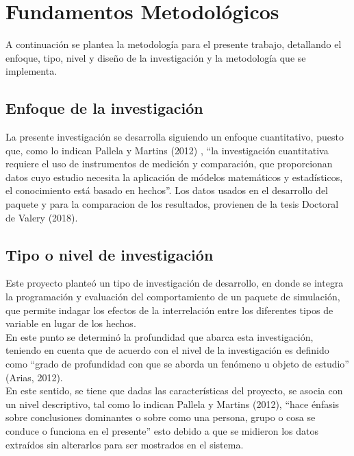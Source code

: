 \chapter{Fundamentos Metodol\'ogicos}

	A continuaci\'on se plantea la metodolog\'ia para el presente trabajo, detallando el enfoque, tipo, nivel y dise\~no de la investigaci\'on y la metodolog\'ia que se implementa.
	
\section{Enfoque de la investigaci\'on}
	
	La presente investigaci\'on se desarrolla siguiendo un enfoque cuantitativo, puesto que, como lo indican Pallela y  Martins (2012) , “la investigaci\'on cuantitativa requiere el uso de instrumentos de medici\'on y comparaci\'on, que proporcionan datos cuyo estudio necesita la aplicaci\'on de m\'odelos matem\'aticos y estad\'isticos, el conocimiento est\'a basado en hechos”.  Los datos usados en el desarrollo del paquete y para la comparacion de los resultados, provienen de la tesis Doctoral de Valery (2018).\\
	
\section{Tipo o nivel de investigaci\'on}
	
	Este proyecto plante\'o un tipo de investigaci\'on de desarrollo, en donde se integra la programaci\'on y evaluaci\'on del comportamiento de un paquete de simulación, que permite indagar los efectos de la interrelaci\'on entre los diferentes tipos de variable en lugar de los hechos.\\

	En este punto se determinó la profundidad que abarca esta investigaci\'on, teniendo en cuenta que de acuerdo con  el nivel de la investigaci\'on es definido como “grado de profundidad con que se aborda un fen\'omeno u objeto de estudio” (Arias, 2012).\\

	En este sentido, se tiene que dadas las caracter\'isticas del proyecto, se asocia con un nivel descriptivo, tal como lo indican Pallela y  Martins (2012),  “hace \'enfasis sobre conclusiones dominantes o sobre como una persona, grupo o cosa se conduce o funciona en el presente” esto debido a que se midieron los datos extra\'idos sin alterarlos para ser mostrados en el sistema.\\

